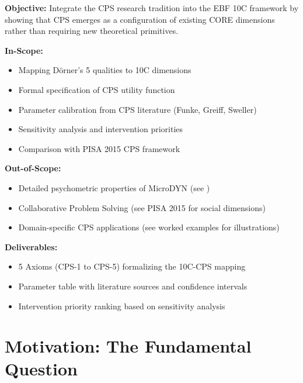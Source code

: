 \begin{tcolorbox}[colback=green!5!white, colframe=green!75!black,
    title=Appendix Scope]

\textbf{Objective:} Integrate the CPS research tradition into the EBF 10C framework by showing that CPS emerges as a configuration of existing CORE dimensions rather than requiring new theoretical primitives.

\textbf{In-Scope:}
\begin{itemize}[nosep]
\item Mapping Dörner's 5 qualities to 10C dimensions
\item Formal specification of CPS utility function
\item Parameter calibration from CPS literature (Funke, Greiff, Sweller)
\item Sensitivity analysis and intervention priorities
\item Comparison with PISA 2015 CPS framework
\end{itemize}

\textbf{Out-of-Scope:}
\begin{itemize}[nosep]
\item Detailed psychometric properties of MicroDYN (see \cite{greiff2013cps})
\item Collaborative Problem Solving (see PISA 2015 for social dimensions)
\item Domain-specific CPS applications (see worked examples for illustrations)
\end{itemize}

\textbf{Deliverables:}
\begin{itemize}[nosep]
\item 5 Axioms (CPS-1 to CPS-5) formalizing the 10C-CPS mapping
\item Parameter table with literature sources and confidence intervals
\item Intervention priority ranking based on sensitivity analysis
\end{itemize}

\end{tcolorbox}



\section{Motivation: The Fundamental Question}
\label{sec:cps-motivation}

